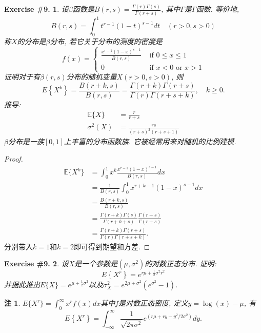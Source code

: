 \documentclass[UTF8, a4paper]{article}
\newtheorem{exercise}{Exercise \#9.}
\newtheorem*{remark}{注}
\begin{document}
\begin{framed}
\begin{exercise}
设\(\beta\)函数是\(B(r,s) = \frac{\Gamma(r)\Gamma(s)}{\Gamma(r+s)}\), 其中\(\Gamma\)是\(\Gamma\)函数. 等价地, 
$$
B(r, s)=\int_0^1 t^{r-1}(1-t)^{s-1} d t \quad(r>0, s>0)
$$
称\(X\)的分布是\(\beta\)分布, 若它关于分布的测度的密度是
$$
f(x)= \begin{cases}\frac{x^{r-1}(1-x)^{s-1}}{B(r, s)} & \text { if } 0 \leq x \leq 1 \\ 0 & \text { if } x<0 \text { or } x>1\end{cases}
$$
证明对于有\(\beta(r,s)\)分布的随机变量\(X(r>0, s>0)\), 则
$$
E\left\{X^k\right\}=\frac{B(r+k, s)}{B(r, s)}=\frac{\Gamma(r+k) \Gamma(r+s)}{\Gamma(r) \Gamma(r+s+k)}, \quad k \geq 0.
$$
推导:
$$
\begin{aligned}
\mathbb{E}\{X\} & =\frac{r}{r+s} \\
\sigma^2(X) & =\frac{r s}{(r+s)^2(r+s+1)}
\end{aligned}
$$
\(\beta\)分布是一族\([0,1]\)上丰富的分布函数族.
它被经常用来对随机的比例建模.
\end{exercise}
\end{framed}

\begin{proof}
$$
\begin{aligned}
    \mathbb{E}\{X^k\} &= \int_0^1 x^k \frac{x^{r-1}(1-x)^{s-1}}{B(r, s)} dx \\
    &= \frac{1}{B(r, s)} \int_0^1 x^{r+k-1}(1-x)^{s-1} dx \\
    &= \frac{B(r+k, s)}{B(r, s)} \\
    &= \frac{\Gamma(r+k)\Gamma(s)}{\Gamma(r+k+s)} \frac{\Gamma(r+s)}{\Gamma(r+s)} \\
    &= \frac{\Gamma(r+k)\Gamma(r+s)}{\Gamma(r)\Gamma(r+s+k)}.
\end{aligned}
$$
分别带入\(k=1\)和\(k=2\)即可得到期望和方差.
\end{proof}



\begin{framed}
\begin{exercise}
设\(X\)是一个参数是\((\mu, \sigma^2)\)的对数正态分布.
证明: 
$$
E\left\{X^r\right\}=e^{r \mu+\frac{1}{2} \sigma^2 r^2}
$$
并据此推出$E\{X\}=e^{\mu+\frac{1}{2} \sigma^2}$以及$\sigma_X^2=e^{2 \mu+\sigma^2}\left(e^{\sigma^2}-1\right)$.
\end{exercise}
\end{framed}


\begin{remark}
\(E\{X^r\} = \int_{0}^{\infty} x^r f(x) dx\)其中\(f\)是对数正态密度, 定义\(y = \log(x) - \mu\), 有
$$
E\left\{X^r\right\}=\int_{-\infty}^{\infty} \frac{1}{\sqrt{2 \pi \sigma^2}} e^{\left(r \mu+r y-y^2 / 2 \sigma^2\right)} d y.
$$
\end{remark}
\end{document}

